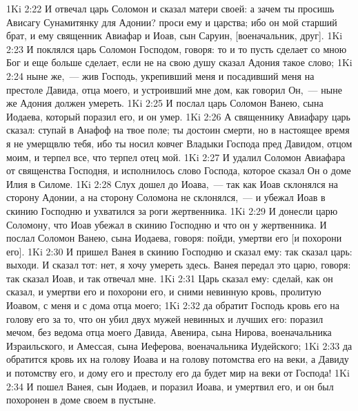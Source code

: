 \vs 1Ki 2:22 И отвечал царь Соломон и сказал матери своей: а зачем ты просишь Ависагу Сунамитянку для Адонии? проси ему  и царства; ибо он мой старший брат, и ему священник Авиафар и Иоав, сын Саруин, [военачальник, друг].
\vs 1Ki 2:23 И поклялся царь Соломон Господом, говоря: то и то пусть сделает со мною Бог и еще больше сделает, если не на свою душу сказал Адония такое слово;
\vs 1Ki 2:24 ныне же,~--- жив Господь, укрепивший меня и посадивший меня на престоле Давида, отца моего, и устроивший мне дом, как говорил Он,~--- ныне же Адония должен умереть.
\vs 1Ki 2:25 И послал царь Соломон Ванею, сына Иодаева, который поразил его, и он умер.
\vs 1Ki 2:26 А священнику Авиафару царь сказал: ступай в Анафоф на твое поле; ты достоин смерти, но в настоящее время я не умерщвлю тебя, ибо ты носил ковчег Владыки Господа пред Давидом, отцом моим, и терпел все, что терпел отец мой.
\vs 1Ki 2:27 И удалил Соломон Авиафара от священства Господня, и исполнилось слово Господа, которое сказал Он о доме Илия в Силоме.
\vs 1Ki 2:28 Слух  дошел до Иоава,~--- так как Иоав склонялся на сторону Адонии, а на сторону Соломона не склонялся,~--- и убежал Иоав в скинию Господню и ухватился за роги жертвенника.
\vs 1Ki 2:29 И донесли царю Соломону, что Иоав убежал в скинию Господню и что он у жертвенника. И послал Соломон Ванею, сына Иодаева, говоря: пойди, умертви его [и похорони его].
\vs 1Ki 2:30 И пришел Ванея в скинию Господню и сказал ему: так сказал царь: выходи. И сказал тот: нет, я хочу умереть здесь. Ванея передал это царю, говоря: так сказал Иоав, и так отвечал мне.
\vs 1Ki 2:31 Царь сказал ему: сделай, как он сказал, и умертви его и похорони его, и сними невинную кровь, пролитую Иоавом, с меня и с дома отца моего;
\vs 1Ki 2:32 да обратит Господь кровь его на голову его за то, что он убил двух мужей невинных и лучших его: поразил мечом, без ведома отца моего Давида, Авенира, сына Нирова, военачальника Израильского, и Амессая, сына Иеферова, военачальника Иудейского;
\vs 1Ki 2:33 да обратится кровь их на голову Иоава и на голову потомства его на веки, а Давиду и потомству его, и дому его и престолу его да будет мир на веки от Господа!
\vs 1Ki 2:34 И пошел Ванея, сын Иодаев, и поразил Иоава, и умертвил его, и он был похоронен в доме своем в пустыне.
